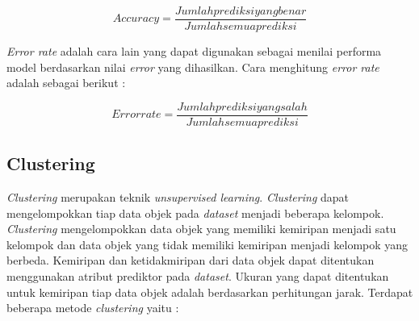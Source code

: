 \begin{displaymath}
    Accuracy  = \frac{Jumlah prediksi yang benar}{Jumlah semua prediksi}
\end{displaymath} 

\textit{Error rate} adalah cara lain yang dapat digunakan sebagai menilai performa model berdasarkan nilai \textit{error} yang dihasilkan. Cara menghitung \textit{error rate} adalah sebagai berikut : 

\begin{displaymath}
 Error rate = \frac{Jumlah prediksi yang salah}{Jumlah semua prediksi}
\end{displaymath}

\subsection{Clustering}
\textit{Clustering} merupakan teknik \textit{unsupervised learning}. \textit{Clustering} dapat mengelompokkan tiap data objek pada \textit{dataset} menjadi beberapa kelompok. \textit{Clustering} mengelompokkan data objek yang memiliki kemiripan menjadi satu kelompok dan data objek yang tidak memiliki kemiripan menjadi kelompok yang berbeda. Kemiripan dan ketidakmiripan dari data objek dapat ditentukan menggunakan atribut prediktor pada \textit{dataset}. Ukuran yang dapat ditentukan untuk kemiripan tiap data objek adalah berdasarkan perhitungan jarak. Terdapat beberapa metode \textit{clustering} yaitu : 

